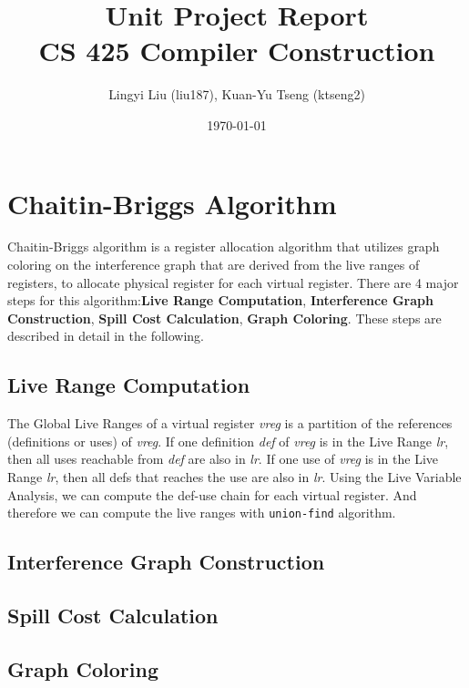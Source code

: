 \documentclass{article}
\title{Unit Project Report \\ CS 425 Compiler Construction} %
\author{Lingyi Liu (liu187), Kuan-Yu Tseng (ktseng2)} %
\date{\today} %
\begin{document}
\maketitle %


\section{Chaitin-Briggs Algorithm}
Chaitin-Briggs algorithm\cite{Chaitin:1982} is a register allocation algorithm that utilizes graph coloring on the interference graph that are derived from the live ranges of registers, to allocate physical register for each virtual register. There are 4 major steps for this algorithm:\textbf{Live Range Computation}, \textbf{Interference Graph Construction}, \textbf{Spill Cost Calculation}, \textbf{Graph Coloring}. These steps are described in detail in the following.
\subsection{Live Range Computation}
The Global Live Ranges of a virtual register \emph{vreg} is a partition of the references (definitions or uses) of \emph{vreg}. If one definition \emph{def} of \emph{vreg} is in the Live Range \emph{lr}, then all uses reachable from \emph{def} are also in \emph{lr}. If one use of \emph{vreg} is in the Live Range \emph{lr}, then all defs that reaches the use are also in \emph{lr}. Using the Live Variable Analysis, we can compute the def-use chain for each virtual register. And therefore we can compute the live ranges with \texttt{union-find} algorithm.
\subsection{Interference Graph Construction}

\subsection{Spill Cost Calculation}
\subsection{Graph Coloring}
\end{document}
